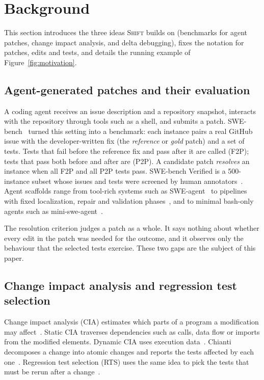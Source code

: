 \documentclass[a4paper,fleqn]{cas-sc}
\newcommand{\tool}{\textsc{Shift}}
\newcommand{\code}[1]{\texttt{\detokenize{#1}}}
\begin{document}
\section{Background}\label{sec:background}

This section introduces the three ideas \tool{} builds on (benchmarks for agent patches, change impact analysis, and delta debugging), fixes the notation for patches, edits and tests, and details the running example of Figure~\ref{fig:motivation}.

\subsection{Agent-generated patches and their evaluation}\label{sec:bg-agents}
A coding agent receives an issue description and a repository snapshot, interacts with the repository through tools such as a shell, and submits a patch. SWE-bench~\citep{jimenez2024swebench} turned this setting into a benchmark: each instance pairs a real GitHub issue with the developer-written fix (the \emph{reference} or \emph{gold} patch) and a set of tests. Tests that fail before the reference fix and pass after it are called \code{FAIL_TO_PASS} (F2P); tests that pass both before and after are \code{PASS_TO_PASS} (P2P). A candidate patch \emph{resolves} an instance when all F2P and all P2P tests pass. SWE-bench Verified is a 500-instance subset whose issues and tests were screened by human annotators~\citep{chowdhury2024verified}. Agent scaffolds range from tool-rich systems such as SWE-agent~\citep{yang2024sweagent} to pipelines with fixed localization, repair and validation phases~\citep{xia2025agentless}, and to minimal bash-only agents such as mini-swe-agent~\citep{miniswe2025}.

The resolution criterion judges a patch as a whole. It says nothing about whether every edit in the patch was needed for the outcome, and it observes only the behaviour that the selected tests exercise. These two gaps are the subject of this paper.

\subsection{Change impact analysis and regression test selection}\label{sec:bg-cia}
Change impact analysis (CIA) estimates which parts of a program a modification may affect~\citep{bohner1996cia,li2013cia}. Static CIA traverses dependencies such as calls, data flow or imports from the modified elements. Dynamic CIA uses execution data~\citep{orso2003field}. Chianti decomposes a change into atomic changes and reports the tests affected by each one~\citep{ren2004chianti}. Regression test selection (RTS) uses the same idea to pick the tests that must be rerun after a change~\citep{rothermel1997safe,yoo2012regression,gligoric2015ekstazi}.
\end{document}
